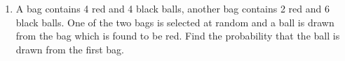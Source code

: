 \renewcommand{\theequation}{\theenumi}
\begin{enumerate}[label=\thesection.\arabic*.,ref=\thesection.\theenumi]
\item A bag contains 4 red and 4 black balls, another
bag contains 2 red and 6 black balls. One of
the two bags is selected at random and a ball
is drawn from the bag which is found to be
red. Find the probability that the ball is drawn
from the first bag.

\end{enumerate}